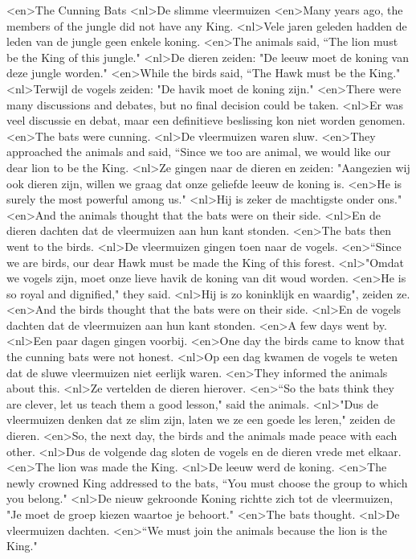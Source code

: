 <en>The Cunning Bats
<nl>De slimme vleermuizen
<en>Many years ago, the members of the jungle did not have any King.
<nl>Vele jaren geleden hadden de leden van de jungle geen enkele koning.
<en>The animals said, “The lion must be the King of this jungle."
<nl>De dieren zeiden: "De leeuw moet de koning van deze jungle worden."
<en>While the birds said, “The Hawk must be the King."
<nl>Terwijl de vogels zeiden: "De havik moet de koning zijn."
<en>There were many discussions and debates, but no final decision could be taken.
<nl>Er was veel discussie en debat, maar een definitieve beslissing kon niet worden genomen.
<en>The bats were cunning.
<nl>De vleermuizen waren sluw.
<en>They approached the animals and said, “Since we too are animal, we would like our dear lion to be the King.
<nl>Ze gingen naar de dieren en zeiden: "Aangezien wij ook dieren zijn, willen we graag dat onze geliefde leeuw de koning is.
<en>He is surely the most powerful among us."
<nl>Hij is zeker de machtigste onder ons."
<en>And the animals thought that the bats were on their side.
<nl>En de dieren dachten dat de vleermuizen aan hun kant stonden.
<en>The bats then went to the birds.
<nl>De vleermuizen gingen toen naar de vogels.
<en>“Since we are birds, our dear Hawk must be made the King of this forest.
<nl>"Omdat we vogels zijn, moet onze lieve havik de koning van dit woud worden.
<en>He is so royal and dignified," they said.
<nl>Hij is zo koninklijk en waardig", zeiden ze.
<en>And the birds thought that the bats were on their side.
<nl>En de vogels dachten dat de vleermuizen aan hun kant stonden.
<en>A few days went by.
<nl>Een paar dagen gingen voorbij.
<en>One day the birds came to know that the cunning bats were not honest.
<nl>Op een dag kwamen de vogels te weten dat de sluwe vleermuizen niet eerlijk waren.
<en>They informed the animals about this.
<nl>Ze vertelden de dieren hierover.
<en>“So the bats think they are clever, let us teach them a good lesson," said the animals.
<nl>"Dus de vleermuizen denken dat ze slim zijn, laten we ze een goede les leren," zeiden de dieren.
<en>So, the next day, the birds and the animals made peace with each other.
<nl>Dus de volgende dag sloten de vogels en de dieren vrede met elkaar.
<en>The lion was made the King.
<nl>De leeuw werd de koning.
<en>The newly crowned King addressed to the bats, “You must choose the group to which you belong."
<nl>De nieuw gekroonde Koning richtte zich tot de vleermuizen, "Je moet de groep kiezen waartoe je behoort."
<en>The bats thought.
<nl>De vleermuizen dachten.
<en>“We must join the animals because the lion is the King."
